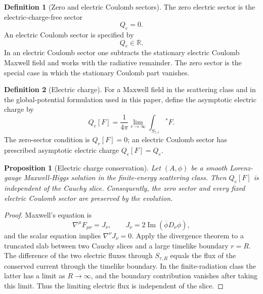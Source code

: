 \documentclass[11pt]{article}
\numberwithin{equation}{section}
\theoremstyle{plain}
\newtheorem{proposition}[theorem]{Proposition}
\theoremstyle{definition}
\newtheorem{definition}{Definition}[section]
\theoremstyle{remark}
\begin{document}
\begin{definition}[Zero and electric Coulomb sectors]\label{def:charge-sector}
The zero electric sector is the electric-charge-free sector
\begin{equation}
 Q_e =0.
\end{equation}
An electric Coulomb sector is specified by
\begin{equation}
 Q_e\in\mathbb R.
\end{equation}
In an electric Coulomb sector one subtracts the stationary electric Coulomb Maxwell field and works with the radiative remainder.  The zero sector is the special case in which the stationary Coulomb part vanishes.
\end{definition}

\begin{definition}[Electric charge]\label{def:charges}
For a Maxwell field in the scattering class and in the global-potential formulation used in this paper, define the asymptotic electric charge by
\begin{equation}
 Q_e[F]=\frac{1}{4\pi}\lim_{r\to\infty}\int_{S_{\tau,r}}{}^*F.
\end{equation}
The zero-sector condition is $Q_e[F]=0$; an electric Coulomb sector has prescribed asymptotic electric charge $Q_e[F]=Q_e$.
\end{definition}

\begin{proposition}[Electric charge conservation]\label{prop:sector-preservation-charge-conservation}
Let $(A,\phi)$ be a smooth Lorenz-gauge Maxwell-Higgs solution in the finite-energy scattering class.  Then $Q_e[F]$ is independent of the Cauchy slice.  Consequently, the zero sector and every fixed electric Coulomb sector are preserved by the evolution.
\end{proposition}

\begin{proof}
Maxwell's equation is
\begin{equation}
 \nabla^\mu F_{\mu\nu}=J_\nu,
 \qquad
 J_\nu=2\operatorname{Im}(\overline\phi D_\nu\phi),
\end{equation}
and the scalar equation implies $\nabla^\nu J_\nu=0$.  Apply the divergence theorem to a truncated slab between two Cauchy slices and a large timelike boundary $r=R$.  The difference of the two electric fluxes through $S_{\tau,R}$ equals the flux of the conserved current through the timelike boundary.  In the finite-radiation class the latter has a limit as $R\to\infty$, and the boundary contribution vanishes after taking this limit.  Thus the limiting electric flux is independent of the slice.
\end{proof}
\end{document}
